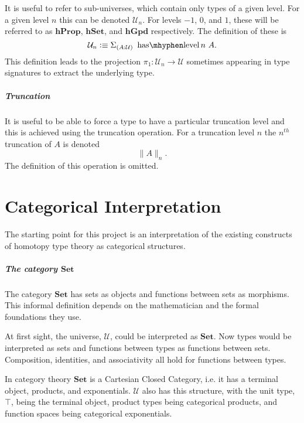 \documentclass[12pt, parskip, DIV=14]{scrbook}
\newcommand{\defeq}{\vcentcolon\equiv}
\newcommand{\haslevel}{\operatorname{has\mhyphen level}}
\newcommand{\hProp}{\mathbf{hProp}}
\newcommand{\hSet}{\mathbf{hSet}}
\newcommand{\hGpd}{\mathbf{hGpd}}
\begin{document}
It is useful to refer to sub-universes, which contain only types of a given level. For a given level $n$ this can be denoted $\mathcal{U}_n$. For levels $-1$, $0$, and $1$, these will be referred to as $\hProp$, $\hSet$, and $\hGpd$ respectively. The definition of these is
$$\mathcal{U}_n \defeq \Sigma_{(A : \mathcal{U})}~\haslevel n~A.$$ This definition leads to the projection $\pi_1 : \mathcal{U}_n \to \mathcal{U}$ sometimes appearing in type signatures to extract the underlying type.

\paragraph{Truncation}

It is useful to be able to force a type to have a particular truncation level and this is achieved using the truncation operation. For a truncation level $n$ the $n^{th}$ truncation of $A$ is denoted
$$\| A \|_n.$$
The definition of this operation is omitted.

\chapter{Categorical Interpretation}
\label{chap:interp}

The starting point for this project is an interpretation of the existing constructs of homotopy type theory as categorical structures.

\paragraph{The category $\mathbf{Set}$}

The category $\mathbf{Set}$ has sets as objects and functions between sets as morphisms. This informal definition depends on the mathematician and the formal foundations they use.

At first sight, the universe, $\mathcal{U}$, could be interpreted as $\mathbf{Set}$. Now types would be interpreted as sets and functions between types as functions between sets. Composition, identities, and associativity all hold for functions between types.

In category theory $\mathbf{Set}$ is a Cartesian Closed Category, i.e. it has a terminal object, products, and exponentials. $\mathcal{U}$ also has this structure, with the unit type, $\top$, being the terminal object, product types being categorical products, and function spaces being categorical exponentials.
\end{document}
